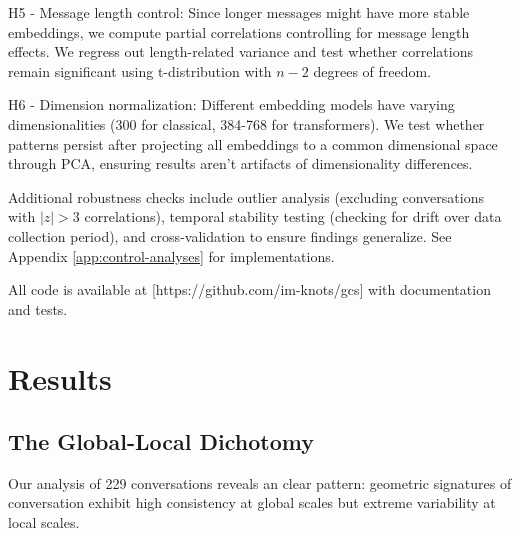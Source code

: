 \documentclass[11pt,letterpaper]{article}
\newcommand{\totalConversations}{229}
\begin{document}
H5 - Message length control: Since longer messages might have more stable embeddings, we compute partial correlations controlling for message length effects. We regress out length-related variance and test whether correlations remain significant using t-distribution with $n-2$ degrees of freedom.

H6 - Dimension normalization: Different embedding models have varying dimensionalities (300 for classical, 384-768 for transformers). We test whether patterns persist after projecting all embeddings to a common dimensional space through PCA, ensuring results aren't artifacts of dimensionality differences.

Additional robustness checks include outlier analysis (excluding conversations with $|z| > 3$ correlations), temporal stability testing (checking for drift over data collection period), and cross-validation to ensure findings generalize. See Appendix \ref{app:control-analyses} for implementations.

All code is available at [https://github.com/im-knots/gcs] with documentation and tests.

\section{Results}

\subsection{The Global-Local Dichotomy}

Our analysis of \totalConversations{} conversations reveals an clear pattern: geometric signatures of conversation exhibit high consistency at global scales but extreme variability at local scales.
\end{document}
